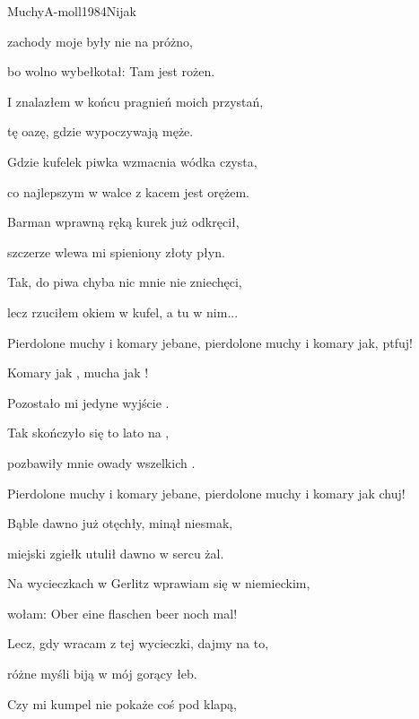 \begin{song}{Muchy}{A-moll}{1984}{Nijak}{}{}
\begin{SBVerse}
	zachody moje były nie na próżno,

	bo wolno wybełkotał: Tam jest rożen.
	\end{SBVerse}
	\begin{SBVerse}
	I znalazłem w końcu pragnień moich przystań,

	tę oazę, gdzie wypoczywają męże.

	Gdzie kufelek piwka wzmacnia wódka czysta,

	co najlepszym w walce z kacem jest orężem.
	\end{SBVerse}
	\begin{SBVerse}
	Barman wprawną ręką kurek już odkręcił,

	szczerze wlewa mi spieniony złoty płyn.

	Tak, do piwa chyba nic mnie nie zniechęci,

	lecz rzuciłem okiem w kufel, a tu w nim...
	\end{SBVerse}

	\begin{SBChorus}
	Pierdolone muchy i komary jebane, pierdolone muchy i komary jak, ptfuj!
	\end{SBChorus}

	\begin{SBVerse}
	Komary jak , mucha jak !

	Pozostało mi jedyne wyjście .

	Tak skończyło się to lato na ,

	pozbawiły mnie owady wszelkich .
	\end{SBVerse}

	\begin{SBChorus}
	Pierdolone muchy i komary jebane, pierdolone muchy i komary jak chuj!
	\end{SBChorus}

	\begin{SBVerse}
	Bąble dawno już otęchły, minął niesmak,

	miejski zgiełk utulił dawno w sercu żal.

	Na wycieczkach w Gerlitz wprawiam się w niemieckim,

	wołam: Ober eine flaschen beer noch mal!
	\end{SBVerse}
	\begin{SBVerse}
	Lecz, gdy wracam z tej wycieczki, dajmy na to,

	różne myśli biją w mój gorący łeb.

	Czy mi kumpel nie pokaże coś pod klapą,


\end{SBVerse}
\end{song}

